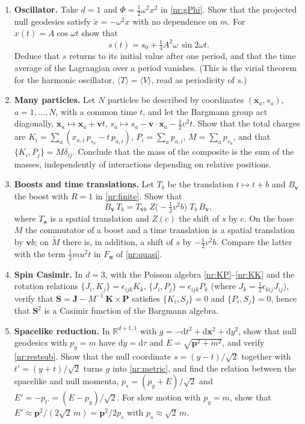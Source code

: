 \begin{enumerate}
\item \textbf{Oscillator.} Take $d=1$ and $\Phi=\tfrac12\omega^2x^2$ in
\eqref{nr:gPhi}. Show that the projected null geodesics satisfy
$\ddot x=-\omega^2x$ with no dependence on $m$. For $x(t)=A\cos\omega t$ show
that
\[
  s(t)=s_0+\tfrac14 A^2\omega\,\sin 2\omega t .
\]
Deduce that $s$ returns to its initial value after one period, and that the
time average of the Lagrangian over a period vanishes. (This is the virial
theorem for the harmonic oscillator, $\langle T\rangle=\langle V\rangle$,
read as periodicity of $s$.)

\item \textbf{Many particles.} Let $N$ particles be described by coordinates
$(\mathbf{x}_a,s_a)$, $a=1,\dots,N$, with a common time $t$, and let the
Bargmann group act diagonally, $\mathbf{x}_a\mapsto\mathbf{x}_a+\mathbf{v}t$,
$s_a\mapsto s_a-\mathbf{v}\cdot\mathbf{x}_a-\tfrac12v^2t$. Show that the total
charges are $K_i=\sum_a(x_{a,i}\,p_{s_a}-t\,p_{a,i})$, $P_i=\sum_a p_{a,i}$,
$M=\sum_a p_{s_a}$, and that $\{K_i,P_j\}=M\delta_{ij}$. Conclude that the mass
of the composite is the sum of the masses, independently of interactions
depending on relative positions.

\item \textbf{Boosts and time translations.} Let $T_b$ be the translation
$t\mapsto t+b$ and $B_{\mathbf v}$ the boost with $R=1$ in \eqref{nr:finite}.
Show that
\[
  B_{\mathbf v}\,T_b=T_{\mathbf{v}b}\;Z\bigl(-\tfrac12v^2b\bigr)\;T_b\,B_{\mathbf v},
\]
where $T_{\mathbf a}$ is a spatial translation and $Z(c)$ the shift of $s$ by $c$.
On the base $M$ the commutator of a boost and a time translation is a spatial
translation by $\mathbf{v}b$; on $\tilde M$ there is, in addition, a shift of
$s$ by $-\tfrac12 v^2b$. Compare the latter with the term $\tfrac12mu^2t$ in
$F_{\mathbf u}$ of \eqref{nr:quasi}.

\item \textbf{Spin Casimir.} In $d=3$, with the Poisson algebra
\eqref{nr:KP}--\eqref{nr:KK} and the rotation relations
$\{J_i,K_j\}=\epsilon_{ijk}K_k$, $\{J_i,P_j\}=\epsilon_{ijk}P_k$ (where
$J_k=\tfrac12\epsilon_{kij}J_{ij}$), verify that
$\mathbf{S}=\mathbf{J}-M^{-1}\,\mathbf{K}\times\mathbf{P}$ satisfies
$\{K_i,S_j\}=0$ and $\{P_i,S_j\}=0$, hence that $\mathbf{S}^2$ is a Casimir
function of the Bargmann algebra.

\item \textbf{Spacelike reduction.} In $\mathbb{R}^{d+1,1}$ with
$g=-\mathrm{d}t^2+\mathrm{d}\mathbf{x}^2+\mathrm{d}y^2$, show that null geodesics with
$p_y=m$ have $\mathrm{d}y=\mathrm{d}\tau$ and $E=\sqrt{\mathbf{p}^2+m^2}$, and verify
\eqref{nr:restsub}. Show that the null coordinate $s=(y-t)/\sqrt2$ together with
$t'=(y+t)/\sqrt2$ turns $g$ into \eqref{nr:metric}, and find the relation between the
spacelike and null momenta, $p_s=(p_y+E)/\sqrt2$ and $E'=-p_{t'}=(E-p_y)/\sqrt2$.
For slow motion with $p_y=m$, show that $E'\approx\mathbf{p}^2/(2\sqrt2\,m)=\mathbf{p}^2/2p_s$ with
$p_s\approx\sqrt2\,m$.


\end{enumerate}
